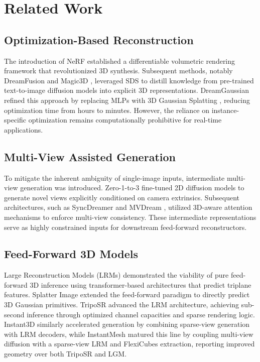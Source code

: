 \documentclass[10pt, conference]{IEEEtran}
\begin{document}
\section{Related Work}

\subsection{Optimization-Based Reconstruction}
The introduction of NeRF \cite{nerf2020} established a differentiable volumetric rendering framework that revolutionized 3D synthesis. Subsequent methods, notably DreamFusion \cite{dreamfusion2022} and Magic3D \cite{magic3d2023}, leveraged SDS to distill knowledge from pre-trained text-to-image diffusion models into explicit 3D representations. DreamGaussian \cite{dreamgaussian} refined this approach by replacing MLPs with 3D Gaussian Splatting \cite{3dgs2023}, reducing optimization time from hours to minutes. However, the reliance on instance-specific optimization remains computationally prohibitive for real-time applications.

\subsection{Multi-View Assisted Generation}
To mitigate the inherent ambiguity of single-image inputs, intermediate multi-view generation was introduced. Zero-1-to-3 \cite{zero1to3} fine-tuned 2D diffusion models to generate novel views explicitly conditioned on camera extrinsics. Subsequent architectures, such as SyncDreamer \cite{syncdreamer} and MVDream \cite{mvdream2023}, utilized 3D-aware attention mechanisms to enforce multi-view consistency. These intermediate representations serve as highly constrained inputs for downstream feed-forward reconstructors.

\subsection{Feed-Forward 3D Models}
Large Reconstruction Models (LRMs) \cite{lrm2024} demonstrated the viability of pure feed-forward 3D inference using transformer-based architectures that predict triplane features. Splatter Image \cite{splatterimage} extended the feed-forward paradigm to directly predict 3D Gaussian primitives. TripoSR \cite{triposr2024} advanced the LRM architecture, achieving sub-second inference through optimized channel capacities and sparse rendering logic. Instant3D \cite{instant3d} similarly accelerated generation by combining sparse-view generation with LRM decoders, while InstantMesh \cite{instantmesh2024} matured this line by coupling multi-view diffusion with a sparse-view LRM and FlexiCubes extraction, reporting improved geometry over both TripoSR and LGM.
\end{document}
